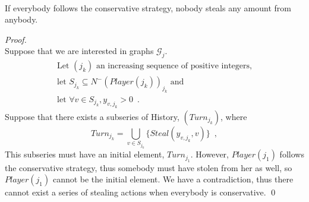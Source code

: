 \documentclass[11pt]{llncs}
\begin{document}
    \begin{theorem} \ \\
       \label{conservativeworld}
       If everybody follows the conservative strategy, nobody steals any amount from anybody.
    \end{theorem}
    \begin{proof} \ \\
       Suppose that we are interested in graphs $\mathcal{G}_j$.
       \begin{equation}
       \begin{gathered}
          \mbox{Let } (j_k) \mbox{ an increasing sequence of positive integers,} \\
          \mbox{let } S_{j_k} \subseteq N^{-}\left(Player\left(j_k\right)\right)_{j_k} \mbox{ and} \\
          \mbox{let } \forall v \in S_{j_k}, y_{v, j_k} > 0\enspace.
       \end{gathered}
       \end{equation}
       Suppose that there exists a subseries of History, $(Turn_{j_k})$, where
       \begin{equation}
          Turn_{j_k} = \bigcup\limits_{v \in S_{j_k}}\{Steal(y_{v, j_k},v)\} \enspace,
       \end{equation}
       This subseries must have an initial element, $Turn_{j_1}$. However, $Player(j_1)$ follows the conservative strategy,
       thus somebody must have stolen from her as well, so $Player(j_1)$ cannot be the initial element. We have a
       contradiction, thus there cannot exist a series of stealing actions when everybody is conservative.
       \qed
    \end{proof}
\end{document}
